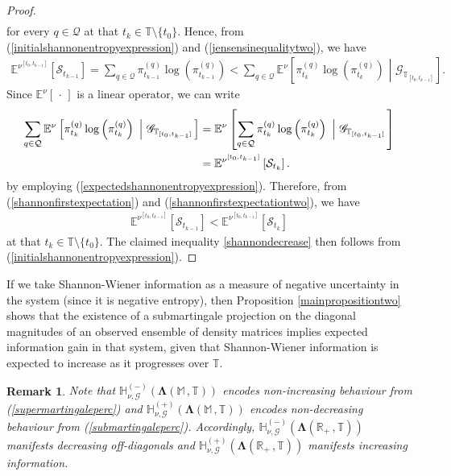 \documentclass[12pt,a4paper]{article}
\newtheorem{rem}[thm]{Remark}
\def\R{\mathbb{R}}
\def\T{\mathbb{T}}
\def\G{\mathscr{G}}
\begin{document}
\begin{proof}
\begin{align}
\end{align}
for every $q\in\mathcal{Q}$ at that $t_k\in\T\setminus\{t_0\}$. Hence, from (\ref{initialshannonentropyexpression}) and (\ref{jensensinequalitytwo}), we have
\begin{align}
\mathbb{E}^{\nu^{[t_{0},t_{k-1}]}}\left[\mathcal{S}_{t_{k-1}}\right] = \sum_{q\in\mathcal{Q}} \pi^{(q)}_{t_{k-1}}\log\left( \pi^{(q)}_{t_{k-1}}\right) < \sum_{q\in\mathcal{Q}}\mathbb{E}^{\nu}\left[\pi^{(q)}_{t_{k}}\log\left(\pi^{(q)}_{t_{k}} \right)  \,\, \left| \,\, \G_{\T_{[t_0,t_{k-1}]}} \right.\right] . \label{shannonfirstexpectation}
\end{align}
Since $\mathbb{E}^{\nu}[\,\cdot \,]$ is a linear operator, we can write
\begin{align}
\sum_{q\in\mathcal{Q}}\mathbb{E}^{\nu}\left[\pi^{(q)}_{t_{k}}\log\left(\pi^{(q)}_{t_{k}} \right)  \,\, \left| \,\, \G_{\T_{[t_0,t_{k-1}]}} \right.\right]  &= \mathbb{E}^{\nu}\left[\sum_{q\in\mathcal{Q}}\pi^{(q)}_{t_{k}}\log\left(\pi^{(q)}_{t_{k}} \right)  \,\, \left| \,\, \G_{\T_{[t_0,t_{k-1}]}} \right.\right] \notag \\
&= \mathbb{E}^{\nu^{[t_{0},t_{k-1}]}}\left[\mathcal{S}_{t_{k}}\right]. \label{shannonfirstexpectationtwo}
\end{align}
by employing (\ref{expectedshannonentropyexpression}). Therefore, from (\ref{shannonfirstexpectation}) and (\ref{shannonfirstexpectationtwo}), we have
\begin{align}
\mathbb{E}^{\nu^{[t_{0},t_{k-1}]}}\left[\mathcal{S}_{t_{k-1}}\right] < \mathbb{E}^{\nu^{[t_{0},t_{k-1}]}}\left[\mathcal{S}_{t_{k}}\right] 
\end{align}
at that $t_k\in\T\setminus\{t_0\}$. The claimed inequality \eqref{shannondecrease} then follows from (\ref{initialshannonentropyexpression}).
\end{proof}
If we take Shannon-Wiener information as a measure of negative uncertainty in the system (since it is negative entropy), then Proposition \ref{mainpropositiontwo} shows that the existence of a submartingale projection on the diagonal magnitudes of an observed ensemble of density matrices implies expected information gain in that system, given that Shannon-Wiener information is expected to increase as it progresses over $\T$. 
%
\begin{rem}
\label{remintersection} {\em
Note that $\mathbb{H}^{(-)}_{\nu,\G}(\boldsymbol{\Lambda}(\mathbb M \,, \T))$ encodes non-increasing behaviour from {\rm (\ref{supermartingaleperc})} and $\mathbb{H}^{(+)}_{\nu,\G}(\boldsymbol{\Lambda}(\mathbb M \,, \T))$ encodes non-decreasing behaviour from {\rm (\ref{submartingaleperc})}. Accordingly, $\mathbb{H}^{(-)}_{\nu,\G}(\boldsymbol{\Lambda}(\R_+ \,, \T))$ manifests decreasing off-diagonals and $\mathbb{H}^{(+)}_{\nu,\G}(\boldsymbol{\Lambda}(\R_+ \,, \T))$ manifests increasing information. }
\end{rem}
\end{document}

